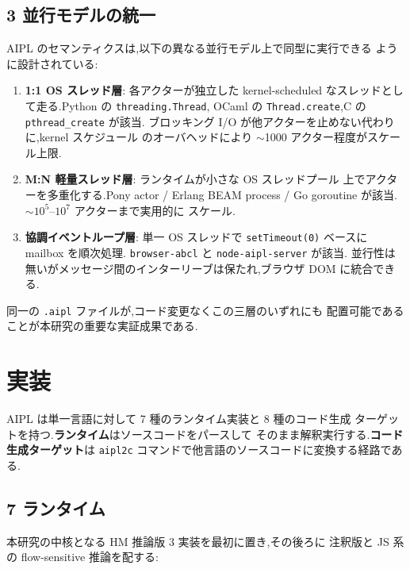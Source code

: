 \documentclass[11pt,a4paper]{article}
\newcommand{\code}[1]{\texttt{\small #1}}
\begin{document}
\subsection{3 並行モデルの統一}

AIPL のセマンティクスは,以下の異なる並行モデル上で同型に実行できる
ように設計されている:

\begin{enumerate}[leftmargin=*]
  \item \textbf{1:1 OS スレッド層}: 各アクターが独立した kernel-scheduled
    なスレッドとして走る.Python の \code{threading.Thread},
    OCaml の \code{Thread.create},C の \code{pthread\_create} が該当.
    ブロッキング I/O が他アクターを止めない代わりに,kernel スケジュール
    のオーバヘッドにより $\sim$1000 アクター程度がスケール上限.
  \item \textbf{M:N 軽量スレッド層}: ランタイムが小さな OS スレッドプール
    上でアクターを多重化する.Pony actor / Erlang BEAM process /
    Go goroutine が該当.$\sim 10^5$--$10^7$ アクターまで実用的に
    スケール.
  \item \textbf{協調イベントループ層}: 単一 OS スレッドで
    \code{setTimeout(0)} ベースに mailbox を順次処理.
    \code{browser-abcl} と \code{node-aipl-server} が該当.
    並行性は無いがメッセージ間のインターリーブは保たれ,ブラウザ DOM
    に統合できる.
\end{enumerate}

同一の \code{.aipl} ファイルが,コード変更なくこの三層のいずれにも
配置可能であることが本研究の重要な実証成果である.

\section{実装}
\label{sec:impl}

AIPL は単一言語に対して 7 種のランタイム実装と 8 種のコード生成
ターゲットを持つ.\textbf{ランタイム}はソースコードをパースして
そのまま解釈実行する.\textbf{コード生成ターゲット}は \code{aipl2c}
コマンドで他言語のソースコードに変換する経路である.

\subsection{7 ランタイム}

本研究の中核となる HM 推論版 3 実装を最初に置き,その後ろに
注釈版と JS 系の flow-sensitive 推論を配する:
\end{document}

